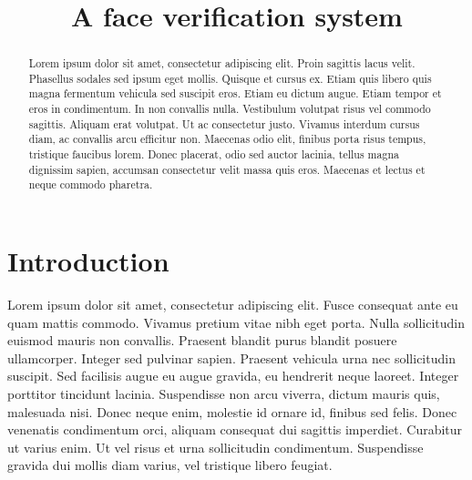 \documentclass[a4paper]{article}
\title{A face verification system}
\begin{document}
\maketitle

%
%

\begin{abstract}

   Lorem ipsum dolor sit amet, consectetur adipiscing elit. Proin sagittis lacus velit. Phasellus sodales sed ipsum eget mollis. Quisque et cursus ex. Etiam quis libero quis magna fermentum vehicula sed suscipit eros. Etiam eu dictum augue. Etiam tempor et eros in condimentum. In non convallis nulla. Vestibulum volutpat risus vel commodo sagittis. Aliquam erat volutpat. Ut ac consectetur justo. Vivamus interdum cursus diam, ac convallis arcu efficitur non. Maecenas odio elit, finibus porta risus tempus, tristique faucibus lorem. Donec placerat, odio sed auctor lacinia, tellus magna dignissim sapien, accumsan consectetur velit massa quis eros. Maecenas et lectus et neque commodo pharetra.

\end{abstract}

\section{Introduction}

%

Lorem ipsum dolor sit amet, consectetur adipiscing elit. Fusce consequat ante eu quam mattis commodo. Vivamus pretium vitae nibh eget porta. Nulla sollicitudin euismod mauris non convallis. Praesent blandit purus blandit posuere ullamcorper. Integer sed pulvinar sapien. Praesent vehicula urna nec sollicitudin suscipit. Sed facilisis augue eu augue gravida, eu hendrerit neque laoreet. Integer porttitor tincidunt lacinia. Suspendisse non arcu viverra, dictum mauris quis, malesuada nisi. Donec neque enim, molestie id ornare id, finibus sed felis. Donec venenatis condimentum orci, aliquam consequat dui sagittis imperdiet. Curabitur ut varius enim. Ut vel risus et urna sollicitudin condimentum. Suspendisse gravida dui mollis diam varius, vel tristique libero feugiat.
\end{document}
